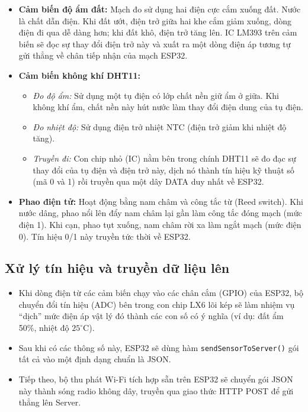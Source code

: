 \documentclass[12pt,a4paper]{report}
\begin{document}
\begin{itemize}
    \item \textbf{Cảm biến độ ẩm đất:} Mạch đo sử dụng hai điện cực cắm xuống đất. Nước là chất dẫn điện. Khi đất ướt, điện trở giữa hai khe cắm giảm xuống, dòng điện đi qua dễ dàng hơn; khi đất khô, điện trở tăng lên. IC LM393 trên cảm biến sẽ đọc sự thay đổi điện trở này và xuất ra một dòng điện áp tương tự gửi thẳng về chân tiếp nhận của mạch ESP32.
    
    \item \textbf{Cảm biến không khí DHT11:}
    \begin{itemize}
        \item \textit{Đo độ ẩm:} Sử dụng một tụ điện có lớp chất nền giữ ẩm ở giữa. Khi không khí ẩm, chất nền này hút nước làm thay đổi điện dung của tụ điện.
        \item \textit{Đo nhiệt độ:} Sử dụng điện trở nhiệt NTC (điện trở giảm khi nhiệt độ tăng).
        \item \textit{Truyền đi:} Con chip nhỏ (IC) nằm bên trong chính DHT11 sẽ đo đạc sự thay đổi của tụ điện và điện trở này, dịch nó thành tín hiệu kỹ thuật số (mã 0 và 1) rồi truyền qua một dây DATA duy nhất về ESP32.
    \end{itemize}
    
    \item \textbf{Phao điện tử:} Hoạt động bằng nam châm và công tắc từ (Reed switch). Khi nước dâng, phao nổi lên đẩy nam châm lại gần làm công tắc đóng mạch (mức điện 1). Khi cạn, phao tụt xuống, nam châm rời xa làm ngắt mạch (mức điện 0). Tín hiệu 0/1 này truyền tức thời về ESP32.
\end{itemize}

\subsection{Xử lý tín hiệu và truyền dữ liệu lên }

\begin{itemize}
    \item Khi dòng điện từ các cảm biến chạy vào các chân cắm (GPIO) của ESP32, bộ chuyển đổi tín hiệu (ADC) bên trong con chip LX6 lõi kép sẽ làm nhiệm vụ ``dịch'' mức điện áp vật lý đó thành các con số có ý nghĩa (ví dụ: đất ẩm 50\%, nhiệt độ $25^\circ$C).
    \item Sau khi có các thông số này, ESP32 sẽ dùng hàm \texttt{sendSensorToServer()} gói tất cả vào một định dạng chuẩn là JSON.
    \item Tiếp theo, bộ thu phát Wi-Fi tích hợp sẵn trên ESP32 sẽ chuyển gói JSON này thành sóng radio không dây, truyền qua giao thức HTTP POST để gửi thẳng lên Server.
\end{itemize}
\end{document}
